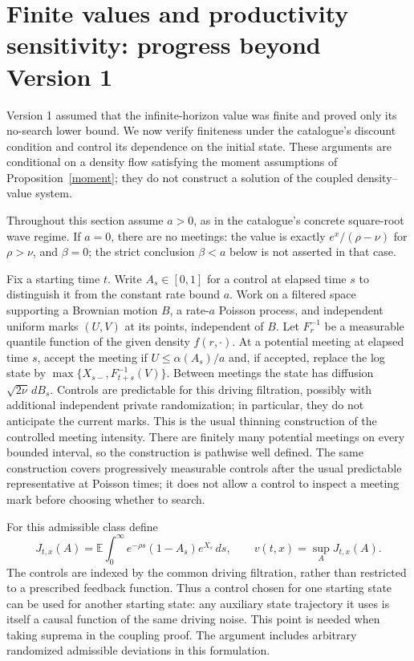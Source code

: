 \documentclass[11pt]{article}
\newcommand{\E}{\mathbb E}
\begin{document}
\section{Finite values and productivity sensitivity: progress beyond Version 1}
Version 1 assumed that the infinite-horizon value was finite and proved
only its no-search lower bound. We now verify finiteness under the
catalogue's discount condition and control its dependence on the initial
state. These arguments are conditional on a density flow satisfying the
moment assumptions of Proposition~\ref{moment}; they do not construct a
solution of the coupled density--value system.

Throughout this section assume $a>0$, as in the catalogue's concrete
square-root wave regime. If $a=0$, there are no meetings: the value is
exactly $e^x/(\rho-\nu)$ for $\rho>\nu$, and $\beta=0$; the strict
conclusion $\beta<a$ below is not asserted in that case.

Fix a starting time $t$. Write $A_s\in[0,1]$ for a control at elapsed time
$s$ to distinguish it from the constant rate bound $a$. Work on a filtered
space supporting a Brownian motion $B$, a rate-$a$ Poisson process,
and independent uniform marks $(U,V)$ at its points, independent of $B$.
Let $F_r^{-1}$ be a measurable quantile function of the given density
$f(r,\cdot)$. At a potential meeting at elapsed time $s$, accept the meeting
if $U\leq\alpha(A_s)/a$ and, if accepted, replace the log state by
$\max\{X_{s-},F_{t+s}^{-1}(V)\}$. Between meetings the state has diffusion
$\sqrt{2\nu}\,dB_s$. Controls are predictable for this driving filtration,
possibly with additional independent private randomization; in particular,
they do not anticipate the current marks. This is the usual thinning
construction of the controlled meeting intensity. There are finitely many
potential meetings on every bounded interval, so the construction is
pathwise well defined. The same construction covers progressively
measurable controls after the usual predictable representative at
Poisson times; it does not allow a control to inspect a meeting mark
before choosing whether to search.

For this admissible class define
\[
 J_{t,x}(A)=\E\int_0^\infty e^{-\rho s}(1-A_s)e^{X_s}\,ds,
 \qquad v(t,x)=\sup_A J_{t,x}(A).
\]
The controls are indexed by the common driving filtration, rather than
restricted to a prescribed feedback function. Thus a control chosen for
one starting state can be used for another starting state: any auxiliary
state trajectory it uses is itself a causal function of the same driving
noise. This point is needed when taking suprema in the coupling proof.
The argument includes arbitrary randomized admissible deviations in this
formulation.
\end{document}
